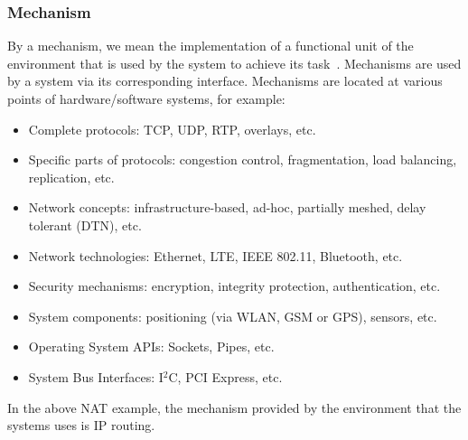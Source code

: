 \subsubsection{Mechanism}
By a mechanism, we mean the implementation of a functional unit of the environment that is used by the system to achieve its task~\cite{frommgen2016mechanism}.
Mechanisms are used by a system via its corresponding interface. 
Mechanisms are located at various points of hardware/software systems, for example:
%
\begin{itemize}
 \item Complete protocols: TCP, UDP, RTP, overlays, etc.
 \item Specific parts of protocols: congestion control, fragmentation, load balancing, replication, etc.
 \item Network concepts: infrastructure-based, ad-hoc, partially meshed, delay tolerant (DTN), etc.
 \item Network technologies: Ethernet, LTE, IEEE 802.11, Bluetooth, etc.
 \item Security mechanisms: encryption, integrity protection, authentication, etc.
 \item System components: positioning (via WLAN, GSM or GPS), sensors, etc.
 \item Operating System APIs: Sockets, Pipes, etc.
 \item System Bus Interfaces: I$^2$C, PCI Express, etc.
\end{itemize}
%
In the above NAT example, the mechanism provided by the environment that the systems uses is IP routing.


